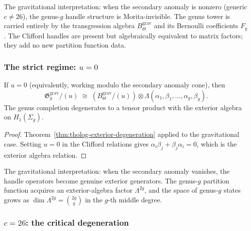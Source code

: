 The gravitational interpretation: when the secondary anomaly is
nonzero (generic $c \ne 26$), the genus-$g$ handle structure
is Morita-invisible. The genus tower is carried entirely by the
transgression algebra $B_\Theta^{\mathrm{grav}}$ and its Bernoulli
coefficients $F_g$. The Clifford handles are present but
algebraically equivalent to matrix factors; they add no new
partition function data.

\subsubsection*{The strict regime: $u = 0$}

\begin{theorem}[Exterior degeneration at $u = 0$;
\ClaimStatusProvedHere]
\label{thm:gravity-exterior-degeneration}
If $u = 0$ \textup{(}equivalently, working modulo the secondary
anomaly cone\textup{)}, then
\begin{equation}\label{eq:gravity-exterior}
\mathfrak{G}_g^{\mathrm{grav}} / (u)
\;\cong\;
\left(B_\Theta^{\mathrm{grav}} / (u)\right)
\otimes
\Lambda(\alpha_1, \beta_1, \ldots, \alpha_g, \beta_g).
\end{equation}
The genus completion degenerates to a tensor product with the
exterior algebra on $H_1(\Sigma_g)$.
\end{theorem}

\begin{proof}
Theorem~\ref{thm:tholog-exterior-degeneration} applied to the
gravitational case. Setting $u = 0$ in the Clifford relations
gives $\alpha_i\beta_j + \beta_j\alpha_i = 0$, which is the
exterior algebra relation.
\end{proof}

The gravitational interpretation: when the secondary anomaly
vanishes, the handle operators become genuine exterior generators.
The genus-$g$ partition function acquires an exterior-algebra
factor $\Lambda^{2g}$, and the space of genus-$g$ states grows
as $\dim \Lambda^{2g} = \binom{2g}{g}$ in the $g$-th middle
degree.

\subsubsection*{$c = 26$: the critical degeneration}

